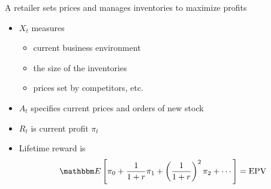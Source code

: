 \begin{frame}

    \Eg A retailer sets prices and manages inventories to maximize profits

    \begin{itemize}
        \item $X_t$ measures 
            \begin{itemize}
                \item current business environment
            \vspace{0.3em}
                \item the size of the inventories
            \vspace{0.3em}
                \item prices set by competitors, etc. 
            \end{itemize}
            \vspace{0.3em}
        \item $A_t$ specifies current prices and orders of new stock
            \vspace{0.3em}
            \vspace{0.3em}
        \item $R_t$ is current profit $\pi_t$
            \vspace{0.3em}
            \vspace{0.3em}
        \item Lifetime reward is 
            \begin{equation*}
                \EE \left[ \pi_0 + \frac{1}{1+r} \pi_1 
                    + \left(\frac{1}{1+r}\right)^2 \pi_2
                    + \cdots \right]
                    = \text{EPV}
            \end{equation*}
    \end{itemize}


\end{frame}



